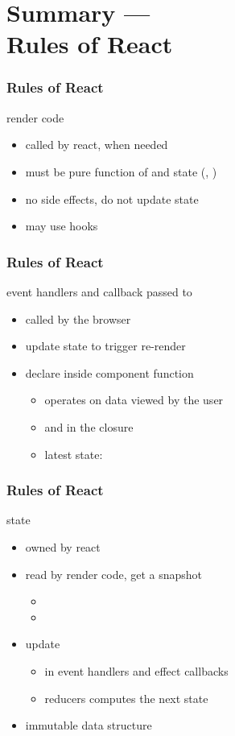 \section{Summary ---\\ Rules of React}
\begin{frame}[fragile] \frametitle{Rules of React}
render code
\begin{itemize}
  \item called by react, when needed
  \item must be pure function of  and state (, )
  \item no side effects, do not update state
  \item may use hooks
\end{itemize}
\end{frame}
\begin{frame}[fragile] \frametitle{Rules of React}
event handlers and callback passed to 
\begin{itemize}
  \item called by the browser
  \item update state to trigger re-render
  \item declare inside component function
  \begin{itemize}
    \item operates on data viewed by the user
    \item {} and  in the closure
    \item latest state: 
  \end{itemize}
\end{itemize}
\end{frame}
\begin{frame}[fragile] \frametitle{Rules of React}
state
\begin{itemize}
  \item owned by react
  \item read by render code, get a snapshot
  \begin{itemize}
    \item {}
    \item {}
  \end{itemize}
  \item update
  \begin{itemize}
    \item {} in event handlers and effect callbacks
    \item reducers computes the next state
  \end{itemize}
  \item immutable data structure
\end{itemize}
\end{frame}
